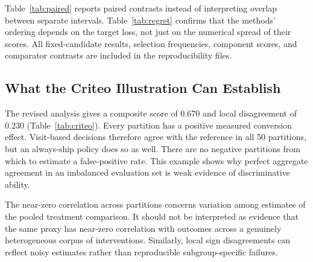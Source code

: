 \documentclass{ieeeaccess}
\begin{document}
\begin{table}[t]
\caption{Paired differences: PROXIMA minus correlation-only selection, with exploratory 95\% Monte Carlo intervals. A positive agreement difference and a negative local-error difference favor PROXIMA.}
\label{tab:paired}\centering
\end{table}
\begin{table}[t]
\caption{Mean regret in simulated outcome-effect units. Lower is better. Regret includes missed benefits as well as harmful launches.}
\label{tab:regret}\centering
\end{table}
Table~\ref{tab:paired} reports paired contrasts instead of interpreting overlap between separate intervals. Table~\ref{tab:regret} confirms that the methods' ordering depends on the target loss, not just on the numerical spread of their scores. All fixed-candidate results, selection frequencies, component scores, and comparator contrasts are included in the reproducibility files.

\subsection{What the Criteo Illustration Can Establish}
\begin{table}[t]
\caption{Criteo visit--conversion illustration. The interval is conditional on the random partitions and is not an interval over independent interventions.}
\label{tab:criteo}\centering
\end{table}
The revised analysis gives a composite score of 0.670 and local disagreement of 0.230 (Table~\ref{tab:criteo}). Every partition has a positive measured conversion effect. Visit-based decisions therefore agree with the reference in all 50 partitions, but an always-ship policy does so as well. There are no negative partitions from which to estimate a false-positive rate. This example shows why perfect aggregate agreement in an imbalanced evaluation set is weak evidence of discriminative ability.

The near-zero correlation across partitions concerns variation among estimates of the pooled treatment comparison. It should not be interpreted as evidence that the same proxy has near-zero correlation with outcomes across a genuinely heterogeneous corpus of interventions. Similarly, local sign disagreements can reflect noisy estimates rather than reproducible subgroup-specific failures.
\end{document}
